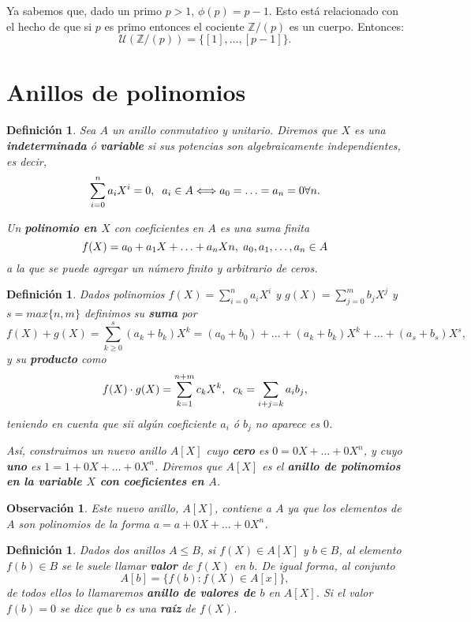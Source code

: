 \documentclass[12pt]{article}
\newtheorem{definition}[theorem]{Definición}
\newtheorem{observation}{Observación}[theorem]
\begin{document}
Ya sabemos que, dado un primo $p>1$, $\phi(p) = p-1$. Esto está relacionado con el hecho de que si $p$ es primo entonces el cociente $\mathbb{Z}/(p)$ es un cuerpo. Entonces: $$\mathcal{U}(\mathbb{Z}/(p)) = \lbrace [1], \ldots, [p-1] \rbrace.$$

\section{Anillos de polinomios}

\begin{definition}Sea $A$ un anillo conmutativo y unitario. Diremos que $X$ es una \textbf{indeterminada} ó \textbf{variable} si sus potencias son algebraicamente independientes, es decir, $$\sum_{i=0}^{n} a_{i}X^{i}=0, \hspace{0.2cm} a_{i}\in A \Longleftrightarrow a_0 = \ldots = a_n = 0 \forall n.$$

Un \textbf{polinomio en $X$} con coeficientes en $A$ es una suma finita $$f(X) = a_0+a_1X+\ldots + a_nXn, \hspace{0.1cm} a_0, a_1, \ldots, a_n \in A$$ a la que se puede agregar un número finito y arbitrario de ceros.  
\end{definition}

\begin{definition}Dados polinomios $f(X) = \sum_{i=0}^n a_iX^i$ y $g(X) = \sum_{j=0}^m b_jX^j$ y $s = max\lbrace n,m \rbrace$ definimos su \textbf{suma} por $$f(X) +g(X) = \sum_{k\geq 0}^s(a_k+b_k)X^k = (a_0+b_0)+\ldots + (a_k+b_k)X^k + \ldots + (a_s+b_s)X^s,$$
y su \textbf{producto} como $$f(X)\cdot g(X) = \sum_{k=1}^{n+m}c_k X^k, \hspace{0.2cm} c_k = \sum_{i+j=k}a_ib_j,$$ teniendo en cuenta que sii algún coeficiente $a_i$ ó $b_j$ no aparece es $0$.

Así, construimos un nuevo anillo $A[X]$ cuyo \textbf{cero} es $0 = 0X + \ldots + 0X^n$, y cuyo \textbf{uno} es $1 = 1+ 0X + \ldots + 0X^n$. Diremos que $A[X]$ es el \textbf{anillo de polinomios en la variable $X$ con coeficientes en $A$}.
\end{definition}

\begin{observation}Este nuevo anillo, $A[X]$, contiene a $A$ ya que los elementos de $A$ son polinomios de la forma $a = a+0X+\ldots + 0X^n$.
\end{observation}

\begin{definition}Dados dos anillos $A \leq B$, si $f(X) \in A[X]$ y $b \in B$, al elemento $f(b) \in B$ se le suele llamar \textbf{\textit{valor}} de $f(X)$ en $b$.  De igual forma, al conjunto $$A[b]= \lbrace f(b) : f(X) \in A[x] \rbrace,$$ de todos ellos lo llamaremos \textbf{\textit{anillo de valores de $b$}} en $A[X]$. Si el valor $f(b)=0$ se dice que $b$ es una \textbf{raíz} de $f(X)$. 
\end{definition}
\end{document}
